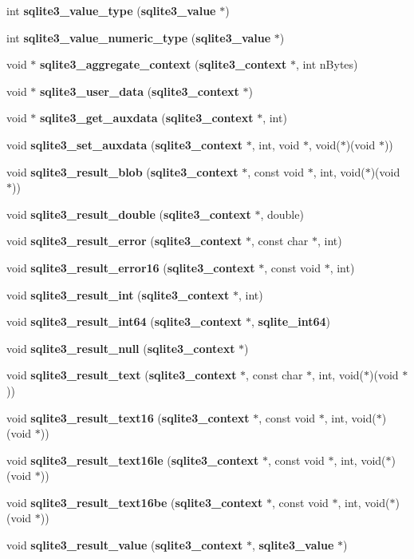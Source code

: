 \begin{DoxyCompactItemize}
\item 
int {\bf sqlite3\_\-value\_\-type} ({\bf sqlite3\_\-value} $\ast$)
\item 
int {\bf sqlite3\_\-value\_\-numeric\_\-type} ({\bf sqlite3\_\-value} $\ast$)
\item 
void $\ast$ {\bf sqlite3\_\-aggregate\_\-context} ({\bf sqlite3\_\-context} $\ast$, int nBytes)
\item 
void $\ast$ {\bf sqlite3\_\-user\_\-data} ({\bf sqlite3\_\-context} $\ast$)
\item 
void $\ast$ {\bf sqlite3\_\-get\_\-auxdata} ({\bf sqlite3\_\-context} $\ast$, int)
\item 
void {\bf sqlite3\_\-set\_\-auxdata} ({\bf sqlite3\_\-context} $\ast$, int, void $\ast$, void($\ast$)(void $\ast$))
\item 
void {\bf sqlite3\_\-result\_\-blob} ({\bf sqlite3\_\-context} $\ast$, const void $\ast$, int, void($\ast$)(void $\ast$))
\item 
void {\bf sqlite3\_\-result\_\-double} ({\bf sqlite3\_\-context} $\ast$, double)
\item 
void {\bf sqlite3\_\-result\_\-error} ({\bf sqlite3\_\-context} $\ast$, const char $\ast$, int)
\item 
void {\bf sqlite3\_\-result\_\-error16} ({\bf sqlite3\_\-context} $\ast$, const void $\ast$, int)
\item 
void {\bf sqlite3\_\-result\_\-int} ({\bf sqlite3\_\-context} $\ast$, int)
\item 
void {\bf sqlite3\_\-result\_\-int64} ({\bf sqlite3\_\-context} $\ast$, {\bf sqlite\_\-int64})
\item 
void {\bf sqlite3\_\-result\_\-null} ({\bf sqlite3\_\-context} $\ast$)
\item 
void {\bf sqlite3\_\-result\_\-text} ({\bf sqlite3\_\-context} $\ast$, const char $\ast$, int, void($\ast$)(void $\ast$))
\item 
void {\bf sqlite3\_\-result\_\-text16} ({\bf sqlite3\_\-context} $\ast$, const void $\ast$, int, void($\ast$)(void $\ast$))
\item 
void {\bf sqlite3\_\-result\_\-text16le} ({\bf sqlite3\_\-context} $\ast$, const void $\ast$, int, void($\ast$)(void $\ast$))
\item 
void {\bf sqlite3\_\-result\_\-text16be} ({\bf sqlite3\_\-context} $\ast$, const void $\ast$, int, void($\ast$)(void $\ast$))
\item 
void {\bf sqlite3\_\-result\_\-value} ({\bf sqlite3\_\-context} $\ast$, {\bf sqlite3\_\-value} $\ast$)

\end{DoxyCompactItemize}
